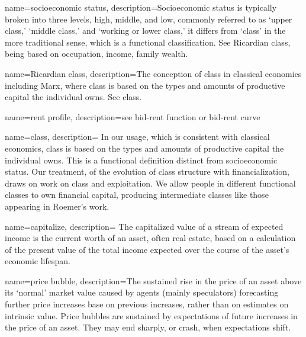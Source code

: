 {
name=socioeconomic status,
description={Socioeconomic status is typically broken into three levels, high, middle, and low,  commonly referred to as `upper class,' `middle class,' and `working or lower class,' it differs from `\gls{class}' in the more traditional sense, which is a functional classification. See \gls{Ricardian class}, being based on occupation, income, family wealth.}
}

{
name=Ricardian class,
description={The conception of class in \gls{classical economics} including Marx, where class is based on the types and amounts of productive capital the individual owns. See \gls{class}.}
}

{
name=rent profile,
description={see \gls{bid-rent function} or \gls{bid-rent curve}}
}

{
name=class,
description={%
In our usage, which is consistent with classical economics, %
class is based on the types and amounts of productive capital the individual owns. This is a functional definition distinct from socioeconomic status. %
Our treatment, of the evolution of class structure with financialization, draws on \cite{roemerGeneralTheoryExploitation1982} work on class and exploitation. We allow people in different functional classes to own financial capital, producing intermediate classes like those appearing in Roemer's work. %
}
}

{
name=capitalize,
description={%
The capitalized value of a stream of expected income %
is the current worth of an asset, often real estate, based on a calculation of the present value of the total income expected over the course of the asset's economic lifespan.}
}

{
name=price bubble,
description={The sustained rise in the price of an asset above its `normal' market value caused by agents (mainly speculators) forecasting further price increases base on previous increases, rather than on estimates on intrinsic value. Price bubbles are sustained by expectations of future increases in the price of an asset. They may end sharply, or crash, when expectations shift.}
}

